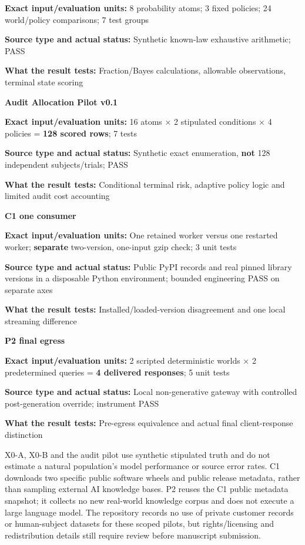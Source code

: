 \documentclass[
  10pt,
  american,
  a4paper,
]{article}
\begin{document}
\textbf{Exact input/evaluation units:} 8 probability atoms; 3 fixed
policies; 24 world/policy comparisons; 7 test groups

\textbf{Source type and actual status:} Synthetic known-law exhaustive
arithmetic; PASS

\textbf{What the result tests:} Fraction/Bayes calculations, allowable
observations, terminal state scoring

\textbf{Audit Allocation Pilot v0.1}

\textbf{Exact input/evaluation units:} 16 atoms × 2 stipulated
conditions × 4 policies = \textbf{128 scored rows}; 7 tests

\textbf{Source type and actual status:} Synthetic exact enumeration,
\textbf{not} 128 independent subjects/trials; PASS

\textbf{What the result tests:} Conditional terminal risk, adaptive
policy logic and limited audit cost accounting

\textbf{C1 one consumer}

\textbf{Exact input/evaluation units:} One retained worker versus one
restarted worker; \textbf{separate} two-version, one-input gzip check; 3
unit tests

\textbf{Source type and actual status:} Public PyPI records and real
pinned library versions in a disposable Python environment; bounded
engineering PASS on separate axes

\textbf{What the result tests:} Installed/loaded-version disagreement
and one local streaming difference

\textbf{P2 final egress}

\textbf{Exact input/evaluation units:} 2 scripted deterministic worlds ×
2 predetermined queries = \textbf{4 delivered responses}; 5 unit tests

\textbf{Source type and actual status:} Local non-generative gateway
with controlled post-generation override; instrument PASS

\textbf{What the result tests:} Pre-egress equivalence and actual final
client-response distinction

X0-A, X0-B and the audit pilot use synthetic stipulated truth and do not
estimate a natural population's model performance or source error rates.
C1 downloads two specific public software wheels and public release
metadata, rather than sampling external AI knowledge bases. P2 reuses
the C1 public metadata snapshot; it collects no new real-world knowledge
corpus and does not execute a large language model. The repository
records no use of private customer records or human-subject datasets for
these scoped pilots, but rights/licensing and redistribution details
still require review before manuscript submission.
\end{document}
